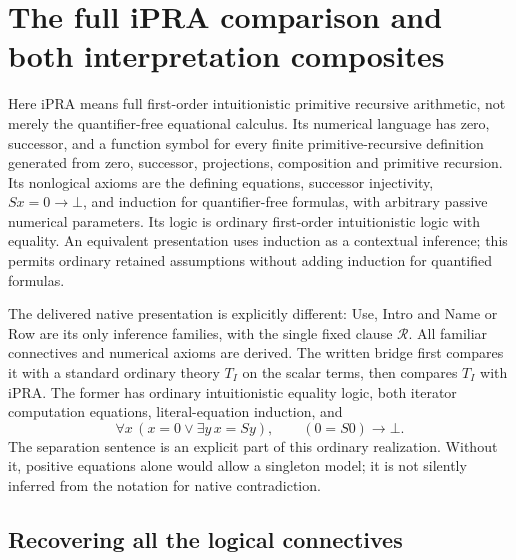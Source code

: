\section{The full iPRA comparison and both interpretation composites}
\label{sec:full-bridge}

Here iPRA means full first-order intuitionistic primitive recursive
arithmetic, not merely the quantifier-free equational calculus. Its numerical
language has zero, successor, and a function symbol for every finite
primitive-recursive definition generated from zero, successor, projections,
composition and primitive recursion. Its nonlogical axioms are the defining
equations, successor injectivity, $Sx=0\to\bot$, and induction for
quantifier-free formulas, with arbitrary passive numerical parameters.
Its logic is ordinary first-order intuitionistic logic with equality.
An equivalent presentation uses induction as a contextual inference; this
permits ordinary retained assumptions without adding induction for quantified
formulas.

The delivered native presentation is explicitly different: Use, Intro and
Name or Row are its only inference families, with the single fixed clause
$\mathcal R$. All familiar connectives and numerical axioms are derived.
The written bridge first compares it with a standard ordinary theory $T_I$
on the scalar terms, then compares $T_I$ with iPRA. The former has ordinary
intuitionistic equality logic, both iterator computation equations,
literal-equation induction, and
\[
 \forall x\,(x=0\vee\exists y\,x=Sy),\qquad (0=S0)\to\bot.
\]
The separation sentence is an explicit part of this ordinary realization.
Without it, positive equations alone would allow a singleton model; it is
not silently inferred from the notation for native contradiction.

\subsection{Recovering all the logical connectives}

